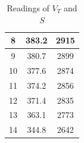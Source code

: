 \documentclass[a4paper,12pt]{article}
\begin{document}
\begin{table}[H]
\begin{subtable}[t]{0.32\textwidth}
\begin{tabular}{|c|c|c|}
			8                                                          & 383.2                                                                            & 2915                                                                \\ \hline
			9                                                          & 380.7                                                                            & 2899                                                                \\ \hline
			10                                                         & 377.6                                                                            & 2874                                                                \\ \hline
			11                                                         & 374.2                                                                            & 2856                                                                \\ \hline
			12                                                         & 371.4                                                                            & 2835                                                                \\ \hline
			13                                                         & 363.1                                                                            & 2773                                                                \\ \hline
			14                                                         & 344.8                                                                            & 2642                                                                \\ \hline
		\end{tabular}
			\caption{Readings of $V_T$ and $S$ } %
		\end{subtable}
	\end{table}
\end{document}
